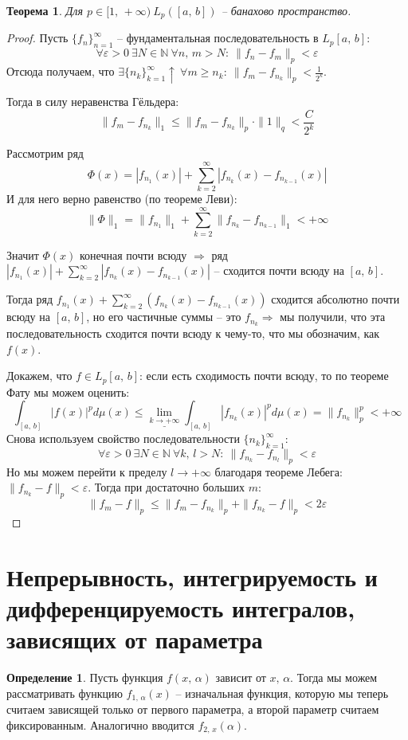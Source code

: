 \documentclass[a4paper,12pt]{article}
\renewcommand{\leq}{\ensuremath{\leqslant}}
\renewcommand{\geq}{\ensuremath{\geqslant}}
\theoremstyle{plain}
\newtheorem{theorem}{Теорема}[section]
\theoremstyle{definition}
\newtheorem{definition}{Определение}[section]
\theoremstyle{remark}
\begin{document}
\begin{theorem}
	Для $p \in [1,\,+\infty) \: L_p([a,\,b])$ -- банахово пространство.
\end{theorem}

\begin{proof}
	Пусть $\{f_n\}_{n = 1}^\infty$ -- фундаментальная последовательность в $L_p[a,\,b]$:
	\[\forall \varepsilon > 0 \: \exists N \in \mathbb{N} \: \forall n,\,m > N :\: \|f_n - f_m\|_p < \varepsilon\]
	Отсюда получаем, что $\exists \{n_k\}_{k = 1}^\infty \uparrow \: \forall m \geq n_k :\: \|f_m - f_{n_k}\|_p < \frac{1}{2^k}$.
	
	Тогда в силу неравенства Гёльдера:
	\[\|f_m - f_{n_k}\|_1 \leq \|f_m - f_{n_k}\|_p \cdot \|1\|_q < \frac{C}{2^k}\]

	Рассмотрим ряд
	\[\Phi(x) = |f_{n_1}(x)| + \sum_{k = 2}^\infty |f_{n_k}(x) - f_{n_{k-1}}(x)|\]
	И для него верно равенство (по теореме Леви):
	\[\|\Phi\|_1 = \|f_{n_1}\|_1 + \sum_{k = 2}^\infty \|f_{n_k} - f_{n_{k-1}}\|_1 < +\infty\]

	Значит $\Phi(x)$ конечная почти всюду $\Rightarrow$ ряд $|f_{n_1}(x)| + \sum_{k = 2}^\infty |f_{n_k}(x) - f_{n_{k-1}}(x)|$ -- сходится почти всюду на $[a,\,b]$.

	Тогда ряд $f_{n_1}(x) + \sum_{k = 2}^\infty (f_{n_k}(x) - f_{n_{k-1}}(x))$ сходится абсолютно почти всюду на $[a,\,b]$, но его частичные суммы -- это $f_{n_k} \Rightarrow$ мы получили, что эта последовательность сходится почти всюду к чему-то, что мы обозначим, как $f(x)$.

	Докажем, что $f \in L_p[a,\,b]$: если есть сходимость почти всюду, то по теореме Фату мы можем оценить:
	\[\int_{[a,\,b]}|f(x)|^pd\mu(x) \leq \underline{\lim\limits_{k \to +\infty}} \int_{[a,\,b]}|f_{n_k}(x)|^pd\mu(x) = \|f_{n_k}\|_p^p < +\infty\]
	Снова используем свойство последовательности $\{n_k\}_{k = 1}^\infty$:
	\[\forall \varepsilon > 0 \: \exists N \in \mathbb{N} \: \forall k,\,l > N :\: \|f_{n_k} - f_{n_l}\|_p < \varepsilon\]
	Но мы можем перейти к пределу $l \to +\infty$ благодаря теореме Лебега: $\|f_{n_k} - f\|_p < \varepsilon$. Тогда при достаточно больших $m$:
	\[\|f_m - f\|_p \leq \|f_m - f_{n_k}\|_p + \|f_{n_k} - f\|_p < 2\varepsilon\]
\end{proof}

\section{Непрерывность, интегрируемость и дифференцируемость интегралов, зависящих от параметра}
\begin{definition}
	Пусть функция $f(x,\,\alpha)$ зависит от $x,\, \alpha$. Тогда мы можем рассматривать функцию $f_{1,\,\alpha}(x)$ -- изначальная функция, которую мы теперь считаем зависящей только от первого параметра, а второй параметр считаем фиксированным. Аналогично вводится $f_{2,\,x}(\alpha)$.
\end{definition}
\end{document}
